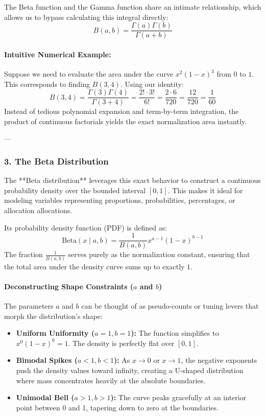 \documentclass{article}
\begin{document}
The Beta function and the Gamma function share an intimate relationship, which allows us to bypass calculating this integral directly:
\begin{equation}
B(a, b) = \frac{\Gamma(a)\Gamma(b)}{\Gamma(a + b)} \tag{199}
\end{equation}

\paragraph{Intuitive Numerical Example:}
Suppose we need to evaluate the area under the curve $x^2(1-x)^3$ from $0$ to $1$. This corresponds to finding $B(3, 4)$. Using our identity:
\begin{equation*}
B(3, 4) = \frac{\Gamma(3)\Gamma(4)}{\Gamma(3+4)} = \frac{2! \cdot 3!}{6!} = \frac{2 \cdot 6}{720} = \frac{12}{720} = \frac{1}{60}
\end{equation*}
Instead of tedious polynomial expansion and term-by-term integration, the product of continuous factorials yields the exact normalization area instantly.

---

\subsubsection*{3. The Beta Distribution}

The **Beta distribution** leverages this exact behavior to construct a continuous probability density over the bounded interval $[0, 1]$. This makes it ideal for modeling variables representing proportions, probabilities, percentages, or allocation allocations.

Its probability density function (PDF) is defined as:
\begin{equation}
\text{Beta}(x \mid a, b) = \frac{1}{B(a, b)} x^{a-1} (1 - x)^{b-1} \tag{198}
\end{equation}
The fraction $\frac{1}{B(a,b)}$ serves purely as the normalization constant, ensuring that the total area under the density curve sums up to exactly $1$.

\paragraph{Deconstructing Shape Constraints ($a$ and $b$)}
The parameters $a$ and $b$ can be thought of as pseudo-counts or tuning levers that morph the distribution's shape:
\begin{itemize}
    \item \textbf{Uniform Uniformity ($a=1, b=1$):} The function simplifies to $x^0(1-x)^0 = 1$. The density is perfectly flat over $[0, 1]$.
    \item \textbf{Bimodal Spikes ($a < 1, b < 1$):} As $x \to 0$ or $x \to 1$, the negative exponents push the density values toward infinity, creating a U-shaped distribution where mass concentrates heavily at the absolute boundaries.
    \item \textbf{Unimodal Bell ($a > 1, b > 1$):} The curve peaks gracefully at an interior point between 0 and 1, tapering down to zero at the boundaries.
\end{itemize}
\end{document}
